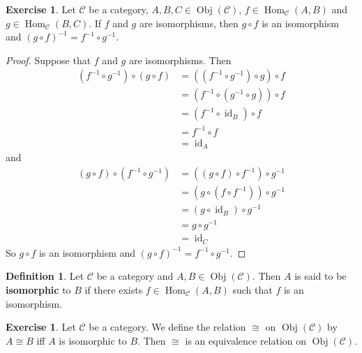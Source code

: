 \documentclass[12pt]{amsart}
\theoremstyle{definition}
\newtheorem{defn}[definition]{Definition}
\newtheorem{ex}[definition]{Exercise}
\newcommand{\MC}{\mathcal{C}}
\DeclareMathOperator{\id}{id}
\DeclareMathOperator{\Obj}{Obj}
\DeclareMathOperator{\Hom}{Hom}
\DeclareMathOperator*{\0}{\mbf{0}}
\DeclareMathOperator*{\1}{\mbf{1}}
\newcommand{\lex}[1]{\label{ex:#1}}
\newcommand{\ld}[1]{\label{defn:#1}}
\begin{document}
	\begin{ex} \lex{15006}
		Let $\MC$ be a category, $A,B,C \in \Obj(\MC)$, $f \in \Hom_{\MC}(A, B)$ and $g \in \Hom_{\MC}(B, C)$. If $f$ and $g$ are isomorphisms, then $g \circ f$ is an isomorphism and $(g \circ f)^{-1} = f^{-1} \circ g^{-1}$. 
	\end{ex}
	
	\begin{proof}
		Suppose that $f$ and $g$ are isomorphisms. Then 
		\begin{align*}
			(f^{-1} \circ g^{-1}) \circ (g \circ f) 
			& = ((f^{-1} \circ g^{-1}) \circ g) \circ f \\
			& = (f^{-1} \circ (g^{-1} \circ g)) \circ f \\
			& = (f^{-1} \circ \id_B) \circ f \\
			& = f^{-1} \circ f \\
			& = \id_{A}
		\end{align*}
		and 
		\begin{align*}
			(g \circ f) \circ (f^{-1} \circ g^{-1}) 
			& = ((g \circ f) \circ f^{-1}) \circ g^{-1} \\
			& = (g \circ (f \circ f^{-1})) \circ g^{-1} \\
			& = (g \circ \id_{B}) \circ g^{-1} \\
			& = g \circ  g^{-1} \\
			& = \id_{C}
		\end{align*}
		So $g \circ f$ is an isomorphism and $(g \circ f)^{-1} = f^{-1} \circ g^{-1}$.
	\end{proof}
	
	\begin{defn} \ld{15007}
		Let $\MC$ be a category and $A,B \in \Obj(\MC)$. Then $A$ is said to be \textbf{isomorphic} to $B$ if there exists $f \in \Hom_{\MC}(A, B)$ such that $f$ is an isomorphism. 
	\end{defn}
	
	\begin{ex} \lex{15008}
		Let $\MC$ be a category. We define the relation $\cong$ on $\Obj(\MC)$ by $A \cong B$ iff $A$ is isomorphic to $B$. Then $\cong$ is an equivalence relation on $\Obj(\MC)$.
	\end{ex}
	
\end{document}
